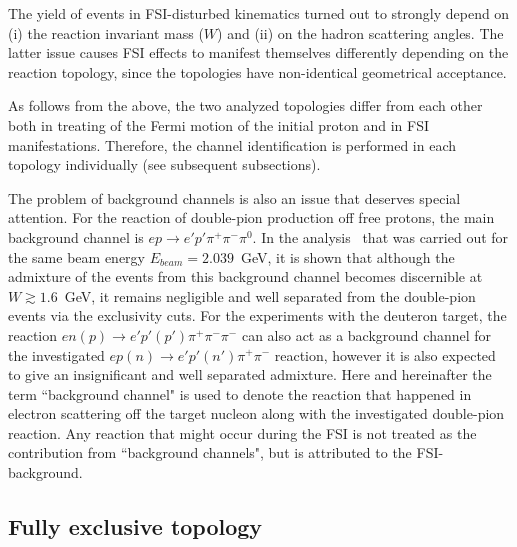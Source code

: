 The yield of events in FSI-disturbed kinematics turned out to strongly depend on (i) the reaction invariant mass ($W$) and (ii) on the hadron scattering angles. The latter issue causes FSI effects to manifest themselves differently depending on the reaction topology, since the topologies have non-identical geometrical acceptance.%

As follows from the above, the two analyzed topologies differ from each other both in treating of the Fermi motion of the initial proton and in FSI manifestations. Therefore, the channel identification is performed in each topology individually (see subsequent subsections). 


The problem of background channels is also an issue that deserves special attention. For the reaction of double-pion production off free protons, the main background channel is $ep\rightarrow e'p'\pi^{+}\pi^{-}\pi^{0}$. In the analysis~\cite{Fed_an_note:2017} that was carried out for the same beam energy $E_{beam} = 2.039$~GeV, it is shown that although the admixture of the events from this background channel becomes discernible at $W\gtrsim 1.6$~GeV, it remains negligible and well separated from the double-pion events via the exclusivity cuts. For the experiments with the deuteron target, the reaction $en(p) \rightarrow e'p'(p')\pi^{+}\pi^{-}\pi^{-}$ can also act as a background channel for the investigated $ep(n) \rightarrow e'p'(n')\pi^{+}\pi^{-}$ reaction, however it is also expected to give an insignificant and well separated admixture. Here and hereinafter the term ``background channel" is used to denote the reaction that happened in electron scattering off the target nucleon along with the investigated double-pion reaction. Any reaction that might occur during the FSI is not treated as the contribution from ``background channels", but is attributed to the FSI-background.



\subsection{Fully exclusive topology}
\label{Sect:excl_cut_fully_excl}


